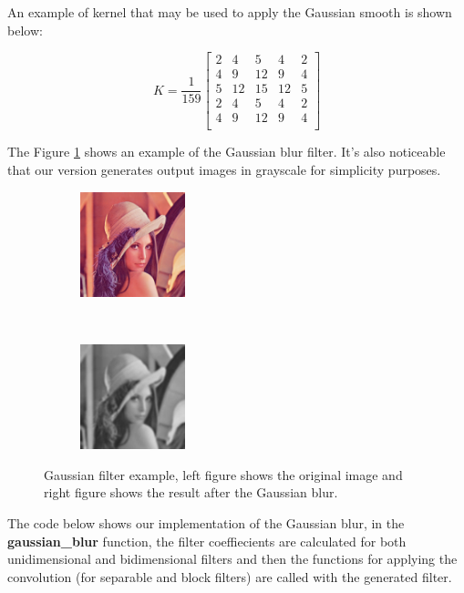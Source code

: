 \documentclass{article}
\begin{document}
An example of kernel that may be used to apply the Gaussian smooth is shown below:

\begin{equation*}
K = \frac{1}{159}
\begin{bmatrix}
2 & 4 & 5 & 4 & 2\\
4 & 9 & 12 & 9 & 4\\
5 & 12 & 15 & 12 & 5\\
2 & 4 & 5 & 4 & 2\\
4 & 9 & 12 & 9 & 4\\
\end{bmatrix}
\end{equation*}

The Figure \ref{fig:gaussian_example} shows an example of the Gaussian blur filter. It's also noticeable that our version generates output images in grayscale for simplicity purposes.

\begin{figure}[t!]
    \centering
    \begin{subfigure}
        \centering
        \includegraphics[height=1.2in]{lenna.png}
    \end{subfigure}%
    ~ 
    \begin{subfigure}
        \centering
        \includegraphics[height=1.2in]{lenna_gaussianblur.jpg}
    \end{subfigure}
    \caption{Gaussian filter example, left figure shows the original image and right figure shows the result after the Gaussian blur.}

\label{fig:gaussian_example}
\end{figure}

\pagebreak

The code below shows our implementation of the Gaussian blur, in the \textbf{gaussian\_blur} function, the filter coeffiecients are calculated for both unidimensional and bidimensional filters and then the functions for applying the convolution (for separable and block filters) are called with the generated filter.
\end{document}
